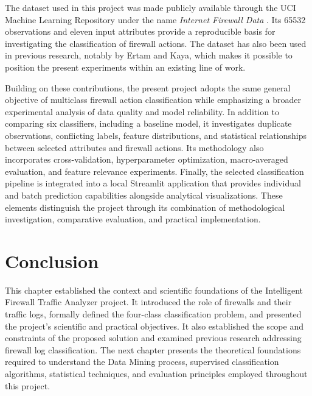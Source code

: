 The dataset used in this project was made publicly available through the UCI Machine Learning Repository under the name \textit{Internet Firewall Data} \cite{uciFirewallData}. Its \num{65532} observations and eleven input attributes provide a reproducible basis for investigating the classification of firewall actions. The dataset has also been used in previous research, notably by Ertam and Kaya, which makes it possible to position the present experiments within an existing line of work.

Building on these contributions, the present project adopts the same general objective of multiclass firewall action classification while emphasizing a broader experimental analysis of data quality and model reliability. In addition to comparing six classifiers, including a baseline model, it investigates duplicate observations, conflicting labels, feature distributions, and statistical relationships between selected attributes and firewall actions. Its methodology also incorporates cross-validation, hyperparameter optimization, macro-averaged evaluation, and feature relevance experiments. Finally, the selected classification pipeline is integrated into a local Streamlit application that provides individual and batch prediction capabilities alongside analytical visualizations. These elements distinguish the project through its combination of methodological investigation, comparative evaluation, and practical implementation.

\section{Conclusion}

This chapter established the context and scientific foundations of the Intelligent Firewall Traffic Analyzer project. It introduced the role of firewalls and their traffic logs, formally defined the four-class classification problem, and presented the project's scientific and practical objectives. It also established the scope and constraints of the proposed solution and examined previous research addressing firewall log classification. The next chapter presents the theoretical foundations required to understand the Data Mining process, supervised classification algorithms, statistical techniques, and evaluation principles employed throughout this project.
